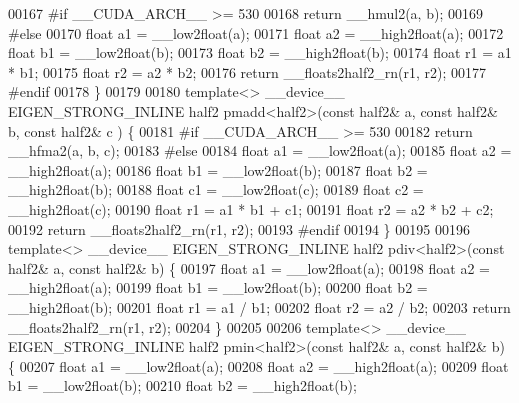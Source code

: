 \begin{DoxyCode}
00167 \textcolor{preprocessor}{#if \_\_CUDA\_ARCH\_\_ >= 530}
00168   \textcolor{keywordflow}{return} \_\_hmul2(a, b);
00169 \textcolor{preprocessor}{#else}
00170   \textcolor{keywordtype}{float} a1 = \_\_low2float(a);
00171   \textcolor{keywordtype}{float} a2 = \_\_high2float(a);
00172   \textcolor{keywordtype}{float} b1 = \_\_low2float(b);
00173   \textcolor{keywordtype}{float} b2 = \_\_high2float(b);
00174   \textcolor{keywordtype}{float} r1 = a1 * b1;
00175   \textcolor{keywordtype}{float} r2 = a2 * b2;
00176   \textcolor{keywordflow}{return} \_\_floats2half2\_rn(r1, r2);
00177 \textcolor{preprocessor}{#endif}
00178 \}
00179 
00180 \textcolor{keyword}{template}<> \_\_device\_\_ EIGEN\_STRONG\_INLINE half2 pmadd<half2>(\textcolor{keyword}{const} half2& a, \textcolor{keyword}{const} half2& b, \textcolor{keyword}{const} half2& c
      ) \{
00181 \textcolor{preprocessor}{#if \_\_CUDA\_ARCH\_\_ >= 530}
00182    \textcolor{keywordflow}{return} \_\_hfma2(a, b, c);
00183 \textcolor{preprocessor}{#else}
00184   \textcolor{keywordtype}{float} a1 = \_\_low2float(a);
00185   \textcolor{keywordtype}{float} a2 = \_\_high2float(a);
00186   \textcolor{keywordtype}{float} b1 = \_\_low2float(b);
00187   \textcolor{keywordtype}{float} b2 = \_\_high2float(b);
00188   \textcolor{keywordtype}{float} c1 = \_\_low2float(c);
00189   \textcolor{keywordtype}{float} c2 = \_\_high2float(c);
00190   \textcolor{keywordtype}{float} r1 = a1 * b1 + c1;
00191   \textcolor{keywordtype}{float} r2 = a2 * b2 + c2;
00192   \textcolor{keywordflow}{return} \_\_floats2half2\_rn(r1, r2);
00193 \textcolor{preprocessor}{#endif}
00194 \}
00195 
00196 \textcolor{keyword}{template}<> \_\_device\_\_ EIGEN\_STRONG\_INLINE half2 pdiv<half2>(\textcolor{keyword}{const} half2& a, \textcolor{keyword}{const} half2& b) \{
00197   \textcolor{keywordtype}{float} a1 = \_\_low2float(a);
00198   \textcolor{keywordtype}{float} a2 = \_\_high2float(a);
00199   \textcolor{keywordtype}{float} b1 = \_\_low2float(b);
00200   \textcolor{keywordtype}{float} b2 = \_\_high2float(b);
00201   \textcolor{keywordtype}{float} r1 = a1 / b1;
00202   \textcolor{keywordtype}{float} r2 = a2 / b2;
00203   \textcolor{keywordflow}{return} \_\_floats2half2\_rn(r1, r2);
00204 \}
00205 
00206 \textcolor{keyword}{template}<> \_\_device\_\_ EIGEN\_STRONG\_INLINE half2 pmin<half2>(\textcolor{keyword}{const} half2& a, \textcolor{keyword}{const} half2& b) \{
00207   \textcolor{keywordtype}{float} a1 = \_\_low2float(a);
00208   \textcolor{keywordtype}{float} a2 = \_\_high2float(a);
00209   \textcolor{keywordtype}{float} b1 = \_\_low2float(b);
00210   \textcolor{keywordtype}{float} b2 = \_\_high2float(b);

\end{DoxyCode}

